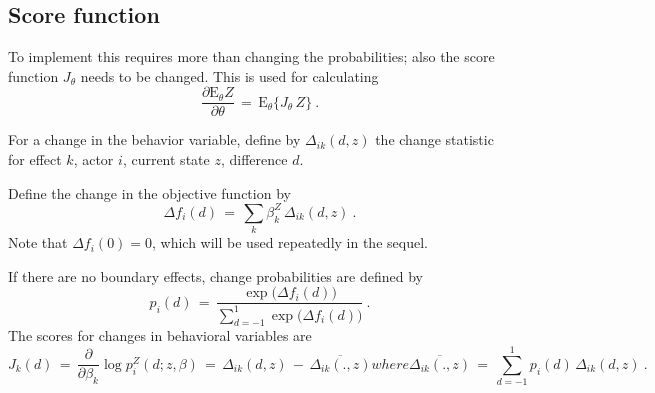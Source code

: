 \documentclass[a4paper,12pt,fleqn]{article}
\newcommand{\E}{\mbox{E}}
\begin{document}
\subsection{Score function}

To implement this requires more than changing the probabilities;
also the score function $J_\theta$ needs to be changed.
This is used for calculating
\[
    \frac{\partial \E_\theta Z}{\partial \theta} \,=\,
             \E_\theta \big\{ J_\theta \, Z \big\} \ .
\]



For a change in the behavior variable, define by $\Delta_{ik}(d, z)$
the change statistic for effect
$k$, actor $i$, current state $z$, difference $d$.

Define the change in the objective function by
\[
  \Delta f_i(d) \,=\, \sum_k \beta^Z_k \, \Delta_{ik}(d, z) \ .
\]
Note that $\Delta f_i(0) = 0$, which will be used repeatedly in the sequel.

If there are no boundary effects, change probabilities are defined by
\begin{equation}\label{pchange}
     p_i(d) \,=\, \frac{\exp\big(\Delta f_i(d)\big)}
                 { \sum_{d=-1}^1 \exp\big(\Delta f_{i}(d)\big)} \ .
\end{equation}
The scores for changes in behavioral variables are
\begin{subequations}\label{sc1}
\begin{equation}
  J_k(d) \,=\, \frac{\partial}{\partial \beta_k} \log p^Z_{i}(d; z, \beta) \,=\,
                  \Delta_{ik}(d, z) \, - \, \overline{ \Delta_{ik}(. , z)}
\end{equation}
where
\begin{equation}
    \overline{\Delta_{ik}(. , z)} \,=\, \sum_{d=-1}^1  p_i(d) \,  \Delta_{ik}(d, z) \ .
\end{equation}
\end{subequations}
\end{document}
